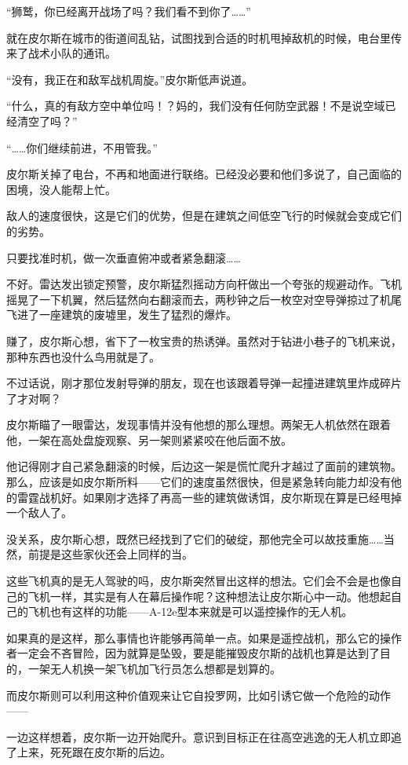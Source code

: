 “狮鹫，你已经离开战场了吗？我们看不到你了……”

就在皮尔斯在城市的街道间乱钻，试图找到合适的时机甩掉敌机的时候，电台里传来了战术小队的通讯。

“没有，我正在和敌军战机周旋。”皮尔斯低声说道。

“什么，真的有敌方空中单位吗！？妈的，我们没有任何防空武器！不是说空域已经清空了吗？”

“……你们继续前进，不用管我。”

皮尔斯关掉了电台，不再和地面进行联络。已经没必要和他们多说了，自己面临的困境，没人能帮上忙。

敌人的速度很快，这是它们的优势，但是在建筑之间低空飞行的时候就会变成它们的劣势。

只要找准时机，做一次垂直俯冲或者紧急翻滚……

不好。雷达发出锁定预警，皮尔斯猛烈摇动方向杆做出一个夸张的规避动作。飞机摇晃了一下机翼，然后猛然向右翻滚而去，两秒钟之后一枚空对空导弹掠过了机尾飞进了一座建筑的废墟里，发生了猛烈的爆炸。

赚了，皮尔斯心想，省下了一枚宝贵的热诱弹。虽然对于钻进小巷子的飞机来说，那种东西也没什么鸟用就是了。

不过话说，刚才那位发射导弹的朋友，现在也该跟着导弹一起撞进建筑里炸成碎片了才对啊？

皮尔斯瞄了一眼雷达，发现事情并没有他想的那么理想。两架无人机依然在跟着他，一架在高处盘旋观察、另一架则紧紧咬在他后面不放。

他记得刚才自己紧急翻滚的时候，后边这一架是慌忙爬升才越过了面前的建筑物。那么，应该是如皮尔斯所料——它们的速度虽然很快，但是紧急转向能力却没有他的雷霆战机好。如果刚才选择了再高一些的建筑做诱饵，皮尔斯现在算是已经甩掉一个敌人了。

没关系，皮尔斯心想，既然已经找到了它们的破绽，那他完全可以故技重施……当然，前提是这些家伙还会上同样的当。

这些飞机真的是无人驾驶的吗，皮尔斯突然冒出这样的想法。它们会不会是也像自己的飞机一样，其实是有人在幕后操作呢？这种想法让皮尔斯心中一动。他想起自己的飞机也有这样的功能——A-12e型本来就是可以遥控操作的无人机。

如果真的是这样，那么事情也许能够再简单一点。如果是遥控战机，那么它的操作者一定会不吝冒险，因为就算是坠毁，要是能摧毁皮尔斯的战机也算是达到了目的，一架无人机换一架飞机加飞行员怎么想都是划算的。

而皮尔斯则可以利用这种价值观来让它自投罗网，比如引诱它做一个危险的动作——

一边这样想着，皮尔斯一边开始爬升。意识到目标正在往高空逃逸的无人机立即追了上来，死死跟在皮尔斯的后边。

